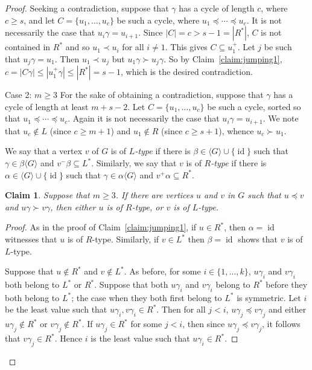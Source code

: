 \documentclass[10pt]{amsart}
\newtheorem{claim}[proposition]{Claim}
\newenvironment{enonce*}[2][]{\par\smallskip\noindent\textbf{#2}.\par\nobreak}{\par\smallskip}
\DeclareMathOperator{\id}{id}
\newcommand{\genset}[1]{\langle#1\rangle}
\begin{document}
\begin{proof}
Seeking a contradiction, suppose that $\gamma$ has
a cycle of length $c$, where $c \geq s$, and let $C = \{u_1, \dots, u_c\}$
be such a cycle, where $u_1 \preceq\cdots\preceq u_c$. It is
not necessarily the case that $u_i \gamma = u_{i+1}$. Since $|C| = c > s - 1 =
|R ^ *|$, $C$ is not contained in $R^*$ and so $u_1 \prec u_i$ for all $i \ne 1$. 
%
This gives $C\subseteq u_1^+$.
%
Let $j$ be such that $u_j\gamma=u_1$. Then $u_1\prec u_j$ but $u_1\gamma\succ u_j\gamma$.
%
So by Claim~\ref{claim:jumping1}, $c = |C \gamma|
\le |u_1^+ \gamma| \le |R^*|=s-1$, which is the desired contradiction. 

\begin{enonce*}[remark]{Case 2: ${m \geq 3}$}
For the sake of obtaining a contradiction, suppose that $\gamma$ has a cycle of length at least $m + s - 2$. Let $C =
\{u_1, \dots, u_c\}$ be such a cycle, sorted so
that $u_1 \preceq \cdots\preceq u_c$. Again it is not
necessarily the case that $u_i \gamma = u_{i+1}$. We note that $u_c \notin L$
(since $c \ge m+1$) and $u_1 \notin R$ (since $c \ge s+1$), whence $u_c \succ
u_1$. 

We say that a vertex $v$ of $G$ is of
\emph{$L$-type} if there is $\beta \in \genset{G} \cup \{ \id \}$ such that
$\gamma \in \beta \genset{G}$ and $v^- \beta \subseteq L^*$. Similarly, we
say that $v$ is of \emph{$R$-type} if there is $\alpha \in \genset{G} \cup
\{ \id \}$ such that $\gamma \in \alpha \genset{G}$ and $v^+ \alpha \subseteq
R^*$. 
\end{enonce*}

\begin{claim} \label{claim:jumping2}
 Suppose that $m\ge 3$. If there are vertices $u$ and $v$ in $G$ such that
 $u\preceq v$ and $u\gamma \succ v\gamma$, then either
 $u$ is of $R$-type, or $v$ is of $L$-type.
\end{claim}
\begin{proof} 
 As in the proof of Claim~\ref{claim:jumping1}, if $u \in R^*$, then 
 $\alpha = \id$ witnesses that $u$ is of $R$-type. Similarly, if 
 $v \in L^*$ then $\beta = \id$ shows that $v$ is of $L$-type. 
 
 Suppose that $u \notin R^*$ and $v \notin L^*$. As before, for some $i\in
 \{1, \ldots, k\}$, $u\gamma_i$ and $v\gamma_i$ both belong to $L^*$ or
 $R^*$. Suppose that both $u\gamma_i$ and $v\gamma_i$ belong to $R^ *$ before
 they both belong to $L ^ *$; the case when they both first belong to $L^*$ is
 symmetric. Let $i$ be the least value such that $u\gamma_i, v\gamma_i\in R ^
 *$. Then for all $j < i$, $u\gamma_j \preceq v\gamma_j$ and either
 $u\gamma_j \notin R^*$ or $v\gamma_j \notin R^*$. If $u\gamma_j \in R ^*$
 for some $j < i$, then since $u\gamma_j\preceq v\gamma_j$, it follows that
 $v\gamma_j \in R ^*$. Hence $i$ is the least value such that $u\gamma_i\in
 R ^ *$.


\end{proof}
\end{proof}
\end{document}
